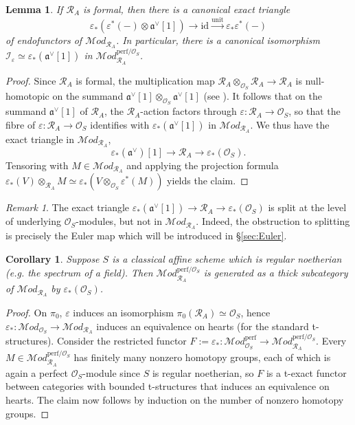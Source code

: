 \documentclass[12pt, oneside]{amsart}
\numberwithin{equation}{section}
\newtheorem{corollary}[subsubsection]{Corollary}
\newtheorem{lemma}[subsubsection]{Lemma}
\theoremstyle{remark}
\newtheorem{remark}[subsubsection]{Remark}
\theoremstyle{plain}
\newcommand{\MOD}{\mathcal{M}\textit{od}}
\newcommand{\R}{\mathcal{R}}
\newcommand{\RA}{\R_A}
\newcommand{\frav}{\mathfrak{a}^\vee}
\newcommand{\OO}{\mathcal{O}}
\newcommand{\id}{\mathrm{id}}
\newcommand{\eps}{\varepsilon}
\begin{document}
\begin{lemma}\label{lem:eps triangle}
  If $\RA$ is formal, then there is a canonical exact triangle
  \[
    \eps_*(\eps^*(-) \otimes \frav[1])
    \to \id
    \xrightarrow{\mathrm{unit}} \eps_*\eps^*(-)
  \]
  of endofunctors of $\MOD_{\RA}$.
  In particular, there is a canonical isomorphism $\mathcal{I}_{\eps} \simeq \eps_*(\frav[1])$ in $\MOD_{\RA}^{\mathrm{perf}/\OO_S}$.
\end{lemma}
\begin{proof}
  Since $\RA$ is formal, the multiplication map $\RA \otimes_{\OO_S} \RA \to \RA$ is null-homotopic on the summand $\frav[1] \otimes_{\OO_S} \frav[1]$ (see \cite[Rem.~7.3.4.16(iii)]{LurieHA}).
  It follows that on the summand $\frav[1]$ of $\RA$, the $\RA$-action factors through $\eps : \RA \to \OO_S$, so that the fibre of $\eps : \RA \to \OO_S$ identifies with $\eps_*(\frav[1])$ in $\MOD_{\RA}$.
  We thus have the exact triangle in $\MOD_{\RA}$,
  \begin{equation}\label{eq:OO(A[-1]) triangle}
    \eps_*(\frav)[1] \to \RA \to \eps_*(\OO_S).
  \end{equation}
  Tensoring with $M \in \MOD_{\RA}$ and applying the projection formula $\eps_*(V) \otimes_{\RA} M \simeq \eps_*(V \otimes_{\OO_S} \eps^*(M))$ yields the claim.
\end{proof}

\begin{remark}
  The exact triangle $\eps_*(\frav[1]) \to \RA \to \eps_*(\OO_S)$ is split at the level of underlying $\OO_S$-modules, but not in $\MOD_{\RA}$.
  Indeed, the obstruction to splitting is precisely the Euler map which will be introduced in \S \ref{sec:Euler}.
\end{remark}

\begin{corollary}\label{cor:sqzero thick=perf/OS}
  Suppose $S$ is a classical affine scheme which is regular noetherian (e.g. the spectrum of a field).
  Then $\MOD_{\RA}^{\mathrm{perf}/\OO_S}$ is generated as a thick subcategory of $\MOD_{\RA}$ by $\eps_*(\OO_S)$.
\end{corollary}
\begin{proof}
  On $\pi_0$, $\eps$ induces an isomorphism $\pi_0(\RA) \simeq \OO_S$, hence $\eps_* : \MOD_{\OO_S} \to \MOD_{\RA}$ induces an equivalence on hearts (for the standard t-structures).
  Consider the restricted functor $F := \eps_* : \MOD_{\OO_S}^{\mathrm{perf}} \to \MOD_{\RA}^{\mathrm{perf}/\OO_S}$.
  Every $M \in \MOD_{\RA}^{\mathrm{perf}/\OO_S}$ has finitely many nonzero homotopy groups, each of which is again a perfect $\OO_S$-module since $S$ is regular noetherian, so $F$ is a t-exact functor between categories with bounded t-structures that induces an equivalence on hearts.
  The claim now follows by induction on the number of nonzero homotopy groups.
\end{proof}
\end{document}
